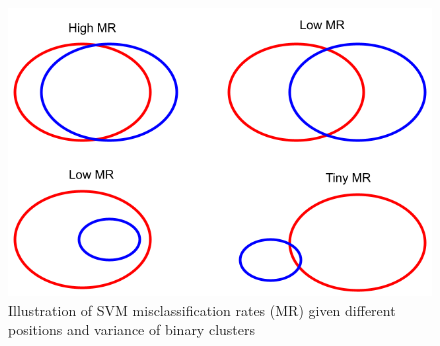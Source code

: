 
\begin{figure}
    \centering
    \includegraphics[width=\textwidth]{./figures/VennDiagram.png}
    \caption{Illustration of SVM misclassification rates (MR) given different positions and variance of binary clusters }
    \label{fig:low_var_high_var_svm_clumps}
\end{figure}


